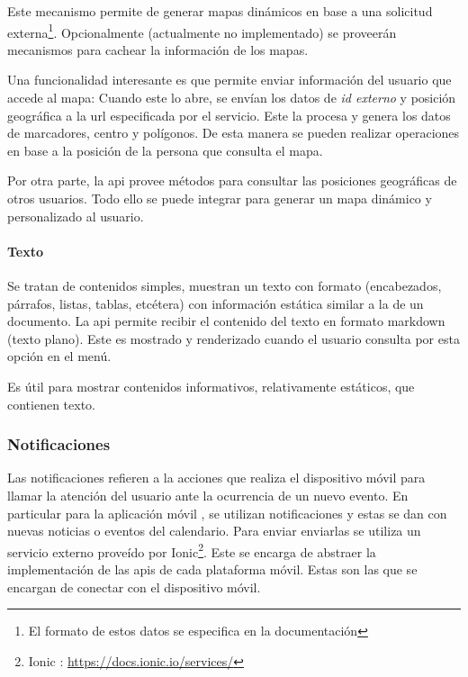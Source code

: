 Este mecanismo permite de generar mapas dinámicos en base a una solicitud externa\footnote{El formato de estos datos se especifica en la documentación}. Opcionalmente (actualmente no implementado) se proveerán mecanismos para cachear la información de los mapas.


Una funcionalidad interesante es que permite enviar información del usuario que accede al mapa: Cuando este lo abre, se envían los datos de \textit{id externo} y posición geográfica a la \gls{url} especificada por el servicio. Este la procesa y genera los datos de marcadores, centro y polígonos. De esta manera se pueden realizar operaciones en base a la posición de la persona que consulta el mapa.

Por otra parte, la \gls{api} provee métodos para consultar las posiciones geográficas de otros usuarios. Todo ello se puede integrar para generar un mapa dinámico y personalizado al usuario.

\paragraph{Texto}
\label{funcionalidad_contenidos_texto} 

Se tratan de contenidos simples, muestran un texto con formato (encabezados, párrafos, listas, tablas, etcétera) con información estática similar a la de un documento. 
La \gls{api} permite recibir el contenido del texto en formato \gls{markdown} (texto plano). Este es mostrado y renderizado cuando el usuario consulta por esta opción en el menú.

Es útil para mostrar contenidos informativos, relativamente estáticos, que contienen texto.

\subsubsection{Notificaciones}
\label{funcionalidad_notificaciones}

Las notificaciones refieren a la acciones que realiza el dispositivo móvil para llamar la atención del usuario ante la ocurrencia de un nuevo evento. En particular para la aplicación móvil \nombreApp{}, se utilizan notificaciones  y estas se dan con nuevas noticias o eventos del calendario. Para enviar enviarlas se utiliza un servicio externo proveído por Ionic\footnote{Ionic : \url{https://docs.ionic.io/services/}}. Este se encarga de abstraer la implementación de las \glspl{api} de cada plataforma móvil. Estas son las que se encargan de conectar con el dispositivo móvil.

